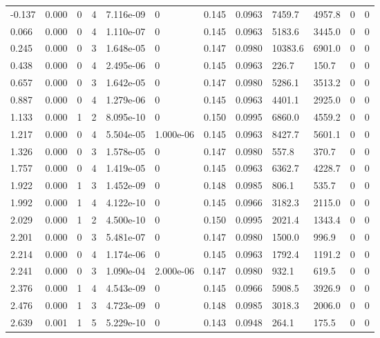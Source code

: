 \documentclass[preview]{standalone}
\begin{document}
{{\begin{tabular}{L{1.2cm}C{1.2cm} C{0.3cm}C{0.5cm} C{1.4cm}C{1.4cm} C{1.4cm}C{1.4cm} C{1.6cm}C{1.6cm} C{1.6cm}C{1.6cm}}
  -0.137  &  0.000  & 0     &  4 &  7.116e-09  & 0  &  0.145&   0.0963& 7459.7 & 4957.8   &  0 & 0  \\ 
  0.066  &  0.000  & 0     &  4 &  1.110e-07  & 0  &  0.145&   0.0963& 5183.6 & 3445.0   &  0 & 0  \\ 
  0.245  &  0.000  & 0     &  3 &  1.648e-05  & 0  &  0.147&   0.0980& 10383.6 & 6901.0   &  0 & 0  \\ 
  0.438  &  0.000  & 0     &  4 &  2.495e-06  & 0  &  0.145&   0.0963& 226.7 & 150.7   &  0 & 0  \\ 
  0.657  &  0.000  & 0     &  3 &  1.642e-05  & 0  &  0.147&   0.0980& 5286.1 & 3513.2   &  0 & 0  \\ 
  0.887  &  0.000  & 0     &  4 &  1.279e-06  & 0  &  0.145&   0.0963& 4401.1 & 2925.0   &  0 & 0  \\ 
  1.133  &  0.000  & 1     &  2 &  8.095e-10  & 0  &  0.150&   0.0995& 6860.0 & 4559.2   &  0 & 0  \\ 
  1.217  &  0.000  & 0     &  4 &  5.504e-05  & 1.000e-06  &  0.145&   0.0963& 8427.7 & 5601.1   &  0 & 0  \\ 
  1.326  &  0.000  & 0     &  3 &  1.578e-05  & 0  &  0.147&   0.0980& 557.8 & 370.7   &  0 & 0  \\ 
  1.757  &  0.000  & 0     &  4 &  1.419e-05  & 0  &  0.145&   0.0963& 6362.7 & 4228.7   &  0 & 0  \\ 
  1.922  &  0.000  & 1     &  3 &  1.452e-09  & 0  &  0.148&   0.0985& 806.1 & 535.7   &  0 & 0  \\ 
  1.992  &  0.000  & 1     &  4 &  4.122e-10  & 0  &  0.145&   0.0966& 3182.3 & 2115.0   &  0 & 0  \\ 
  2.029  &  0.000  & 1     &  2 &  4.500e-10  & 0  &  0.150&   0.0995& 2021.4 & 1343.4   &  0 & 0  \\ 
  2.201  &  0.000  & 0     &  3 &  5.481e-07  & 0  &  0.147&   0.0980& 1500.0 & 996.9   &  0 & 0  \\ 
  2.214  &  0.000  & 0     &  4 &  1.174e-06  & 0  &  0.145&   0.0963& 1792.4 & 1191.2   &  0 & 0  \\ 
  2.241  &  0.000  & 0     &  3 &  1.090e-04  & 2.000e-06  &  0.147&   0.0980& 932.1 & 619.5   &  0 & 0  \\ 
  2.376  &  0.000  & 1     &  4 &  4.543e-09  & 0  &  0.145&   0.0966& 5908.5 & 3926.9   &  0 & 0  \\ 
  2.476  &  0.000  & 1     &  3 &  4.723e-09  & 0  &  0.148&   0.0985& 3018.3 & 2006.0   &  0 & 0  \\ 
  2.639  &  0.001  & 1     &  5 &  5.229e-10  & 0  &  0.143&   0.0948& 264.1 & 175.5   &  0 & 0  \\ 

\end{tabular}}}
\end{document}
